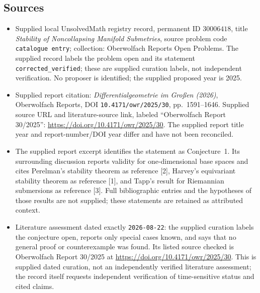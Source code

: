 \documentclass[11pt]{article}
\begin{document}
\subsection{Sources}
\begin{itemize}
\item Supplied local UnsolvedMath registry record, permanent ID \(30006418\), title \emph{Stability of Noncollapsing Manifold Submetries}, source problem code \texttt{catalogue entry}; collection: Oberwolfach Reports Open Problems. The supplied record labels the problem open and its statement \texttt{corrected\_verified}; these are supplied curation labels, not independent verification. No proposer is identified; the supplied proposed year is 2025.
\item Supplied report citation: \emph{Differentialgeometrie im Großen (2026)}, Oberwolfach Reports, DOI \texttt{10.4171/owr/2025/30}, pp.~1591--1646. Supplied source URL and literature-source link, labeled ``Oberwolfach Report 30/2025'': \url{https://doi.org/10.4171/owr/2025/30}. The supplied report title year and report-number/DOI year differ and have not been reconciled.
\item The supplied report excerpt identifies the statement as Conjecture~1. Its surrounding discussion reports validity for one-dimensional base spaces and cites Perelman's stability theorem as reference [2], Harvey's equivariant stability theorem as reference [1], and Tapp's result for Riemannian submersions as reference [3]. Full bibliographic entries and the hypotheses of those results are not supplied; these statements are retained as attributed context.
\item Literature assessment dated exactly \texttt{2026-08-22}: the supplied curation labels the conjecture open, reports only special cases known, and says that no general proof or counterexample was found. Its listed source checked is Oberwolfach Report 30/2025 at \url{https://doi.org/10.4171/owr/2025/30}. This is supplied dated curation, not an independently verified literature assessment; the record itself requests independent verification of time-sensitive status and cited claims.
\end{itemize}
\end{document}

